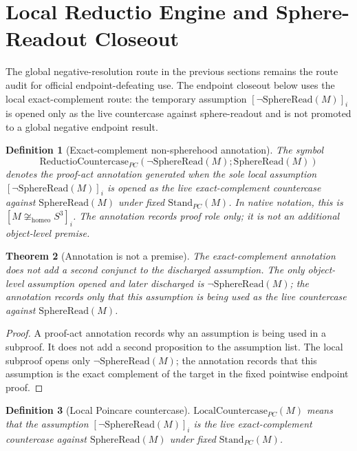 \documentclass[11pt]{article}
\newtheorem{theorem}{Theorem}[section]
\newtheorem{definition}[theorem]{Definition}
\newcommand{\Sthree}{S^{3}}
\newcommand{\StandPC}{\mathrm{Stand}_{PC}}
\newcommand{\SphereRead}{\mathrm{SphereRead}}
\newcommand{\LocalCountercasePC}{\mathrm{LocalCountercase}_{PC}}
\newcommand{\ReductioCountercasePC}{\mathrm{ReductioCountercase}_{PC}}
\newcommand{\Homeo}{\cong_{\mathrm{homeo}}}
\begin{document}
\section{Local Reductio Engine and Sphere-Readout Closeout}\label{sec:local-reductio}

The global negative-resolution route in the previous sections remains the route audit for official endpoint-defeating use. The endpoint closeout below uses the local exact-complement route: the temporary assumption \([\neg\SphereRead(M)]_i\) is opened only as the live countercase against sphere-readout and is not promoted to a global negative endpoint result.

\begin{definition}[Exact-complement non-spherehood annotation]
The symbol
\[
\ReductioCountercasePC(\neg\SphereRead(M);\SphereRead(M))
\]
denotes the proof-act annotation generated when the sole local assumption \([\neg\SphereRead(M)]_i\) is opened as the live exact-complement countercase against \(\SphereRead(M)\) under fixed \(\StandPC(M)\). In native notation, this is \([M\not\Homeo\Sthree]_i\). The annotation records proof role only; it is not an additional object-level premise.
\end{definition}

\begin{theorem}[Annotation is not a premise]\label{thm:pc-annotation-not-premise}
The exact-complement annotation does not add a second conjunct to the discharged assumption. The only object-level assumption opened and later discharged is \(\neg\SphereRead(M)\); the annotation records only that this assumption is being used as the live countercase against \(\SphereRead(M)\).
\end{theorem}
\begin{proof}
A proof-act annotation records why an assumption is being used in a subproof. It does not add a second proposition to the assumption list. The local subproof opens only \(\neg\SphereRead(M)\); the annotation records that this assumption is the exact complement of the target in the fixed pointwise endpoint proof.
\end{proof}

\begin{definition}[Local Poincare countercase]
\(\LocalCountercasePC(M)\) means that the assumption \([\neg\SphereRead(M)]_i\) is the live exact-complement countercase against \(\SphereRead(M)\) under fixed \(\StandPC(M)\).
\end{definition}
\end{document}
